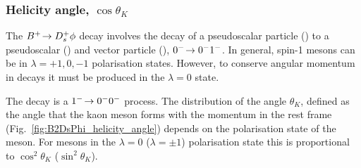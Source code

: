 


\subsubsection{Helicity angle, $\cos\theta_{K}$} 

The ${{{B}^+}}\!\rightarrow {\ensuremath{{D}^+_{s}}}\phi$ decay involves the decay of a pseudoscalar particle (\Bp) to a pseudoscalar (\Dsp) and vector particle (\phiz), $0^{-}\!\rightarrow 0^{-}1^{-}$. In general, spin-1 \phiz mesons can be in $\lambda= +1,0,-1$ polarisation states. However, to conserve angular momentum in \decay{\Bp}{\Dsp\phiz} decays it must be produced in the $\lambda = 0$ state. 

The decay  \decay{\phiz}{\Kp\Km} is a $1^{-}\!\rightarrow 0^{-}0^{-}$ process. 
The distribution of the angle $\theta_{K}$, defined as the angle that the kaon meson forms with the \Bp momentum in the \phiz rest frame (Fig.~\ref{fig:B2DsPhi_helicity_angle}) depends on the polarisation state of the \phiz meson. For \phiz mesons in the $\lambda = 0$ ($\lambda = \pm1$) polarisation state this is proportional to $\cos^{2}{\theta_{K}}$ ($\sin^{2}{\theta_{K}}$).



